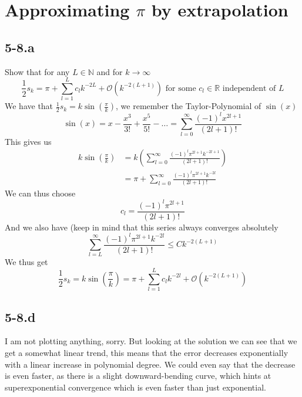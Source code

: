 \documentclass{article}
\begin{document}
\section*{Approximating $\pi$ by extrapolation}
\subsection*{5-8.a} Show that for any $L\in\mathbb{N}$ and for $k \to \infty$
\begin{equation*}
    \frac{1}{2}s_{k} = \pi + \sum_{l=1}^{L}c_{l}k^{-2L} + \mathcal{O}\left(k^{-2\left(L+1\right)}\right) \text{ for some } c_{l} \in \mathbb{R} \text{ independent of } L
\end{equation*}
We have that $\frac{1}{2}s_{k} = k\sin\left(\frac{\pi}{k}\right)$, we remember the Taylor-Polynomial of $\sin\left(x\right)$
\begin{equation*}
    \sin\left(x\right) = x - \frac{x^{3}}{3!} + \frac{x^{5}}{5!} - \dots = \sum_{l=0}^{\infty}\frac{\left(-1\right)^{l}x^{2l + 1}}{\left(2l + 1\right)!}
\end{equation*}
This gives us 
\begin{align*}
    k \sin\left(\frac{\pi}{k}\right) &= k\left(\sum_{l=0}^{\infty} \frac{\left(-1\right)^{l}\pi^{2l + 1}k^{-2l + 1}}{\left(2l+1\right)!}\right) \\[1mm]
    &= \pi + \sum_{l=0}^{\infty} \frac{\left(-1\right)^{l}\pi^{2l + 1}k^{-2l}}{\left(2l+1\right)!}
\end{align*}
We can thus choose 
\begin{equation*}
    c_{l} = \frac{\left(-1\right)^{l}\pi^{2l+1}}{\left(2l+1\right)!}
\end{equation*}
And we also have (keep in mind that this series always converges absolutely
\begin{equation*}
\sum_{l=L}^{\infty} \frac{\left(-1\right)^{l}\pi^{2l + 1}k^{-2l}}{\left(2l+1\right)!} \leq Ck^{-2\left(L+1\right)}
\end{equation*}
We thus get 
\begin{equation*}
    \frac{1}{2}s_{k} = k \sin\left(\frac{\pi}{k}\right) = \pi + \sum_{l=1}^{L}c_{l}k^{-2l} + \mathcal{O}\left(k^{-2\left(L+1\right)}\right)
\end{equation*}
\subsection*{5-8.d} I am not plotting anything, sorry. But looking at the solution we can see that we get a somewhat linear trend, this means that the error decreases exponentially with a linear increase in polynomial degree. We could even say that the decrease is even faster, as there is a slight downward-bending curve, which hints at superexponential convergence which is even faster than just exponential.
\end{document}
